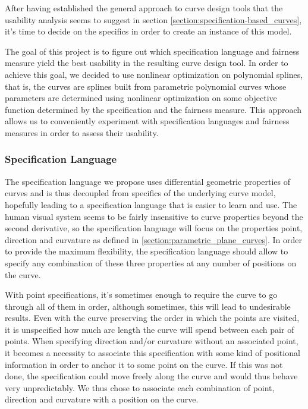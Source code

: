 \documentclass[a4paper]{article}
\begin{document}
			After having established the general approach to curve design tools that the usability analysis seems to suggest in section \ref{section:specification-based_curves}, it's time to decide on the specifics in order to create an instance of this model.

			The goal of this project is to figure out which specification language and fairness measure yield the best usability in the resulting curve design tool. In order to achieve this goal, we decided to use nonlinear optimization on polynomial splines, that is, the curves are splines built from parametric polynomial curves whose parameters are determined using nonlinear optimization on some objective function determined by the specification and the fairness measure. This approach allows us to conveniently experiment with specification languages and fairness measures in order to assess their usability.

			\subsubsection{Specification Language}
			\label{section:specification_language}

				The specification language we propose uses differential geometric properties of curves and is thus decoupled from specifics of the underlying curve model, hopefully leading to a specification language that is easier to learn and use. The human visual system seems to be fairly insensitive to curve properties beyond the second derivative, so the specification language will focus on the properties point, direction and curvature as defined in \ref{section:parametric_plane_curves}. In order to provide the maximum flexibility, the specification language should allow to specify any combination of these three properties at any number of positions on the curve.

				With point specifications, it's sometimes enough to require the curve to go through all of them in order, although sometimes, this will lead to undesirable results. Even with the curve preserving the order in which the points are visited, it is unspecified how much arc length the curve will spend between each pair of points. When specifying direction and/or curvature without an associated point, it becomes a necessity to associate this specification with some kind of positional information in order to anchor it to some point on the curve. If this was not done, the specification could move freely along the curve and would thus behave very unpredictably. We thus chose to associate each combination of point, direction and curvature with a position on the curve.
\end{document}
